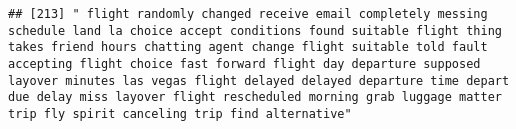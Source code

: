 \documentclass[
]{article}
\begin{document}
\begin{verbatim}
## [213] " flight randomly changed receive email completely messing schedule land la choice accept conditions found suitable flight thing takes friend hours chatting agent change flight suitable told fault accepting flight choice fast forward flight day departure supposed layover minutes las vegas flight delayed delayed departure time depart due delay miss layover flight rescheduled morning grab luggage matter trip fly spirit canceling trip find alternative"                                                                                                                                                                                                                                                                                                                                                                                                                                                                                                                                                                                                                                                                                                                                                                                                                                                                                                                                                                                                                                                                                                                                                                                                                                                                                                                           

\end{verbatim}
\end{document}
